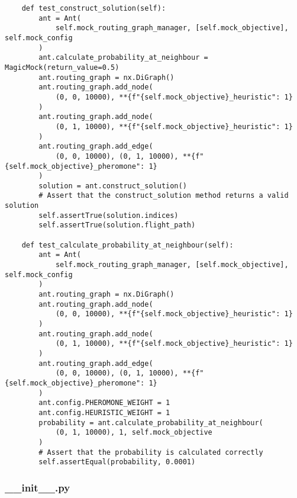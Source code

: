 \begin{verbatim}
    def test_construct_solution(self):
        ant = Ant(
            self.mock_routing_graph_manager, [self.mock_objective], self.mock_config
        )
        ant.calculate_probability_at_neighbour = MagicMock(return_value=0.5)
        ant.routing_graph = nx.DiGraph()
        ant.routing_graph.add_node(
            (0, 0, 10000), **{f"{self.mock_objective}_heuristic": 1}
        )
        ant.routing_graph.add_node(
            (0, 1, 10000), **{f"{self.mock_objective}_heuristic": 1}
        )
        ant.routing_graph.add_edge(
            (0, 0, 10000), (0, 1, 10000), **{f"{self.mock_objective}_pheromone": 1}
        )
        solution = ant.construct_solution()
        # Assert that the construct_solution method returns a valid solution
        self.assertTrue(solution.indices)
        self.assertTrue(solution.flight_path)

    def test_calculate_probability_at_neighbour(self):
        ant = Ant(
            self.mock_routing_graph_manager, [self.mock_objective], self.mock_config
        )
        ant.routing_graph = nx.DiGraph()
        ant.routing_graph.add_node(
            (0, 0, 10000), **{f"{self.mock_objective}_heuristic": 1}
        )
        ant.routing_graph.add_node(
            (0, 1, 10000), **{f"{self.mock_objective}_heuristic": 1}
        )
        ant.routing_graph.add_edge(
            (0, 0, 10000), (0, 1, 10000), **{f"{self.mock_objective}_pheromone": 1}
        )
        ant.config.PHEROMONE_WEIGHT = 1
        ant.config.HEURISTIC_WEIGHT = 1
        probability = ant.calculate_probability_at_neighbour(
            (0, 1, 10000), 1, self.mock_objective
        )
        # Assert that the probability is calculated correctly
        self.assertEqual(probability, 0.0001)

\end{verbatim}
\subsubsection{__init__.py}
\begin{verbatim}

\end{verbatim}
